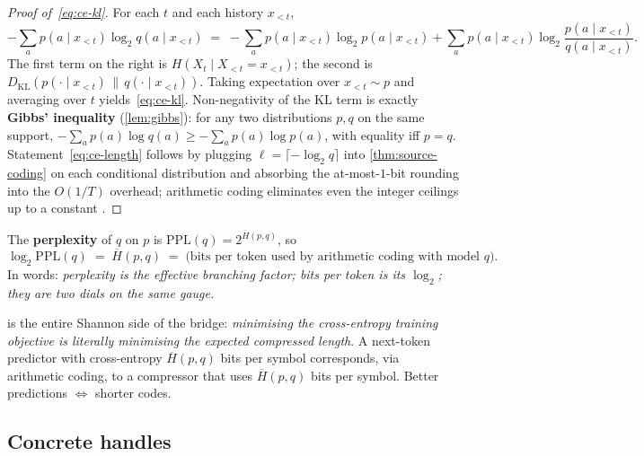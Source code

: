 \begin{proof}[Proof of~\eqref{eq:ce-kl}]
For each $t$ and each history $x_{<t}$,
\[
  -\sum_{a} p(a\!\mid\! x_{<t})\log_2 q(a\!\mid\! x_{<t})
  \;=\;
  -\sum_{a} p(a\!\mid\! x_{<t})\log_2 p(a\!\mid\! x_{<t})
  + \sum_a p(a\!\mid\! x_{<t})\log_2\frac{p(a\!\mid\! x_{<t})}{q(a\!\mid\! x_{<t})}.
\]
The first term on the right is $H(X_t \mid X_{<t} = x_{<t})$; the
second is
$D_{\mathrm{KL}}(p(\cdot\mid x_{<t})\,\|\,q(\cdot\mid x_{<t}))$.
Taking expectation over $x_{<t} \sim p$ and averaging over $t$
yields~\eqref{eq:ce-kl}.  Non-negativity of the KL term is exactly
\textbf{Gibbs' inequality} (\cref{lem:gibbs}): for any two
distributions $p, q$ on the same support,
$-\sum_a p(a)\log q(a) \ge -\sum_a p(a)\log p(a)$, with equality iff
$p = q$.  Statement~\eqref{eq:ce-length} follows by plugging
$\ell = \lceil -\log_2 q\rceil$ into \cref{thm:source-coding} on
each conditional distribution and absorbing the at-most-$1$-bit
rounding into the $O(1/T)$ overhead; arithmetic coding eliminates
even the integer ceilings up to a constant
\citep[Ch.~5]{coverthomas2006}.
\end{proof}

\begin{corollary}
\label{cor:ppl}
The \textbf{perplexity} of $q$ on $p$ is
$\mathrm{PPL}(q) = 2^{\overline{H}(p,q)}$, so
\begin{equation}
  \log_2 \mathrm{PPL}(q) \;=\; \overline{H}(p,q)
  \;=\; \text{(bits per token used by arithmetic coding with model }q\text{)}.
  \label{eq:ppl-bpt}
\end{equation}
In words: \emph{perplexity is the effective branching factor; bits
per token is its $\log_2$; they are two dials on the same gauge.}
\end{corollary}

 is the entire Shannon side of the bridge:
\emph{minimising the cross-entropy training objective is literally
minimising the expected compressed length}.  A next-token predictor
with cross-entropy $\overline{H}(p,q)$ bits per symbol corresponds,
via arithmetic coding, to a compressor that uses
$\overline{H}(p,q)$ bits per symbol.  Better predictions
$\Leftrightarrow$ shorter codes.


\subsection*{Concrete handles}


